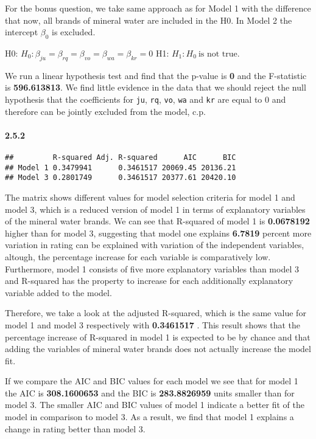 \documentclass[
]{article}
\begin{document}
For the bonus question, we take same approach as for Model 1 with the
difference that now, all brands of mineral water are included in the H0.
In Model 2 the intercept \(\beta_{0}\) is excluded.

H0: \(H_0: \beta_{ju}=\beta_{rq}=\beta_{vo}=\beta_{wa}=\beta_{kr}=0\)
H1: \(H_1: H_0\ \text{is not true.}\)

We run a linear hypothesis test and find that the p-value is \textbf{0}
and the F-statistic is \textbf{596.613813}. We find little evidence in
the data that we should reject the null hypothesis that the coefficients
for \texttt{ju}, \texttt{rq}, \texttt{vo}, \texttt{wa} and \texttt{kr}
are equal to 0 and therefore can be jointly excluded from the model,
c.p.

\hypertarget{section-5}{%
\paragraph{2.5.2}\label{section-5}}

\begin{verbatim}
##         R-squared Adj. R-squared      AIC      BIC
## Model 1 0.3479941      0.3461517 20069.45 20136.21
## Model 3 0.2801749      0.3461517 20377.61 20420.10
\end{verbatim}

The matrix shows different values for model selection criteria for model
1 and model 3, which is a reduced version of model 1 in terms of
explanatory variables of the mineral water brands. We can see that
R-squared of model 1 is \textbf{0.0678192} higher than for model 3,
suggesting that model one explains \textbf{6.7819} percent more
variation in rating can be explained with variation of the independent
variables, altough, the percentage increase for each variable is
comparatively low. Furthermore, model 1 consists of five more
explanatory variables than model 3 and R-squared has the property to
increase for each additionally explanatory variable added to the model.

Therefore, we take a look at the adjusted R-squared, which is the same
value for model 1 and model 3 respectively with \textbf{0.3461517} .
This result shows that the percentage increase of R-squared in model 1
is expected to be by chance and that adding the variables of mineral
water brands does not actually increase the model fit.

If we compare the AIC and BIC values for each model we see that for
model 1 the AIC is \textbf{308.1600653} and the BIC is
\textbf{283.8826959} units smaller than for model 3. The smaller AIC and
BIC values of model 1 indicate a better fit of the model in comparison
to model 3. As a result, we find that model 1 explains a change in
rating better than model 3.
\end{document}
